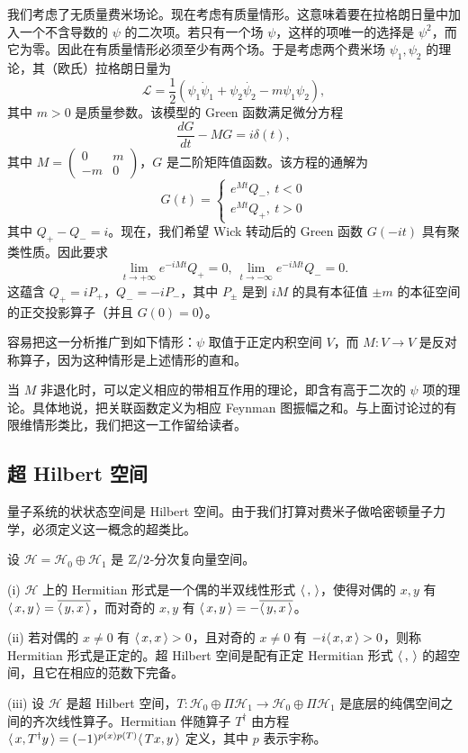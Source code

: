 我们考虑了无质量费米场论。现在考虑有质量情形。这意味着要在拉格朗日量中加入一个不含导数的 $\psi$ 的二次项。若只有一个场 $\psi$，这样的项唯一的选择是 $\psi^2$，而它为零。因此在有质量情形必须至少有两个场。于是考虑两个费米场 $\psi_1,\psi_2$ 的理论，其（欧氏）拉格朗日量为
$$
{\mathcal
L}=\frac{1}{2}(\psi_1\dot{\psi}_1+\psi_2\dot{\psi_2}-m\psi_1\psi_2),
$$
其中 $m>0$ 是质量参数。该模型的 Green 函数满足微分方程
$$
\frac{dG}{dt}-MG=i\delta(t),
$$
其中 $M=\begin{pmatrix} 0&m\\ -m&0\end{pmatrix}$，$G$ 是二阶矩阵值函数。该方程的通解为
$$
G(t)=\begin{cases}e^{Mt}Q_-,\ t<0\\ e^{Mt}Q_+,\ t>0\end{cases}
$$
其中 $Q_+-Q_-=i$。现在，我们希望 Wick 转动后的 Green 函数 $G(-it)$ 具有聚类性质。因此要求
$$
\lim_{t\to +\infty}e^{-iMt}Q_+=0,\ \lim_{t\to -\infty}e^{-iMt}Q_-=0.
$$
这蕴含 $Q_+=iP_+$，$Q_-=-iP_-$，其中 $P_{\pm}$ 是到 $iM$ 的具有本征值 $\pm m$ 的本征空间的正交投影算子（并且 $G(0)=0$）。

\begin{remark} 容易把这一分析推广到如下情形：$\psi$ 取值于正定内积空间 $V$，而 $M:V\to V$ 是反对称算子，因为这种情形是上述情形的直和。
\end{remark}

当 $M$ 非退化时，可以定义相应的带相互作用的理论，即含有高于二次的 $\psi$ 项的理论。具体地说，把关联函数定义为相应 Feynman 图振幅之和。与上面讨论过的有限维情形类比，我们把这一工作留给读者。

\subsection{超 Hilbert 空间}

量子系统的状状态空间是 Hilbert 空间。由于我们打算对费米子做哈密顿量子力学，必须定义这一概念的超类比。

设 ${\mathcal H}={\mathcal H}_0\oplus {\mathcal H}_1$ 是 $\Bbb Z/2$-分次复向量空间。

\begin{definition} (i) ${\mathcal H}$ 上的 Hermitian 形式是一个偶的半双线性形式 $\la,\ra$，使得对偶的 $x,y$ 有 $\la x,y\ra=\overline{\la y,x\ra}$，而对奇的 $x,y$ 有 $\la x,y\ra=-\overline{\la y,x\ra}$。

(ii) 若对偶的 $x\ne 0$ 有 $\la x,x\ra>0$，且对奇的 $x\ne 0$ 有 $-i\la x,x\ra>0$，则称 Hermitian 形式是正定的。超 Hilbert 空间是配有正定 Hermitian 形式 $\la,\ra$ 的超空间，且它在相应的范数下完备。

(iii) 设 $\mathcal H$ 是超 Hilbert 空间，$T: {\mathcal H_0}\oplus \Pi {\mathcal H_1}\to 
{\mathcal H_0}\oplus \Pi {\mathcal H_1}$ 是底层的纯偶空间之间的齐次线性算子。Hermitian 伴随算子 $T^\dagger$ 由方程 $\la x,T^\dagger y\ra=(-1)^{p(x)p(T)}\la Tx,y\ra$ 定义，其中 $p$ 表示宇称。
\end{definition}

